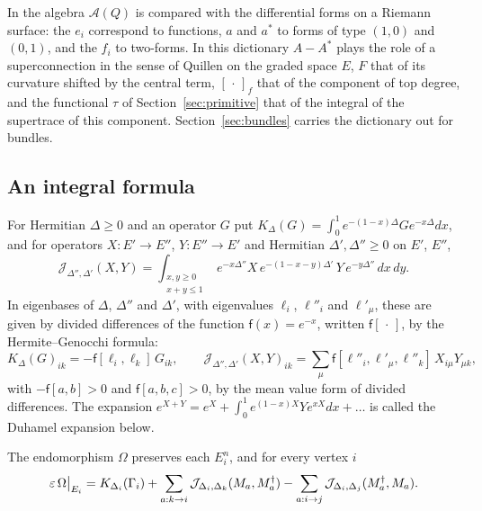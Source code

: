 In \cite[Remark~5.14]{hkkp26} the algebra $\mathcal A(Q)$ is compared with
the differential forms on a Riemann surface: the $e_i$ correspond to
functions, $a$ and $a^*$ to forms of type $(1,0)$ and $(0,1)$, and the $f_i$
to two-forms. In this dictionary $A-A^*$ plays the role of a superconnection
in the sense of Quillen \cite{qui85} on the graded space $E$, $F$ that of
its curvature shifted by the central term, $[\,\cdot\,]_f$ that of the
component of top degree, and the functional $\tau$ of
Section~\ref{sec:primitive} that of the integral of the supertrace of this
component. Section~\ref{sec:bundles} carries the dictionary out for bundles.

\subsection{An integral formula}
For Hermitian $\Delta\geq0$ and an operator $G$ put
$K_\Delta(G)=\int_0^1e^{-(1-x)\Delta}Ge^{-x\Delta}dx$, and for operators
$X:E'\to E''$, $Y:E''\to E'$ and Hermitian $\Delta',\Delta''\geq0$ on $E'$,
$E''$,
\[
 \mathcal J_{\Delta'',\Delta'}(X,Y)
 =\int_{\substack{x,y\geq0\\x+y\leq1}}e^{-x\Delta''}X\,e^{-(1-x-y)\Delta'}\,Y\,e^{-y\Delta''}\,dx\,dy .
\]
In eigenbases of $\Delta$, $\Delta''$ and $\Delta'$, with eigenvalues
$\ell_i$, $\ell''_i$ and $\ell'_\mu$, these are given by divided differences
of the function $\mathsf f(x)=e^{-x}$, written $\mathsf f[\,\cdot\,]$, by the
Hermite--Genocchi formula:
\[
 K_\Delta(G)_{ik}=-\mathsf f[\ell_i,\ell_k]\,G_{ik},\qquad
 \mathcal J_{\Delta'',\Delta'}(X,Y)_{ik}=\sum_\mu\mathsf f[\ell''_i,\ell'_\mu,\ell''_k]\,X_{i\mu}Y_{\mu k},
\]
with $-\mathsf f[a,b]>0$ and $\mathsf f[a,b,c]>0$, by the mean value form of
divided differences. The expansion
$e^{X+Y}=e^X+\int_0^1e^{(1-x)X}Ye^{xX}dx+\dots$ is called the Duhamel
expansion below.

\begin{proposition}\label{prop:coefficient}
The endomorphism $\Omega$ preserves each $E_i^n$, and for every vertex $i$
\[
 \varepsilon\,\Omega\big|_{E_i}=K_{\Delta_i}(\Gamma_i)
 +\sum_{a:k\to i}\mathcal J_{\Delta_i,\Delta_k}(M_a,M_a^\dagger)
 -\sum_{a:i\to j}\mathcal J_{\Delta_i,\Delta_j}(M_a^\dagger,M_a).
\]
\end{proposition}

